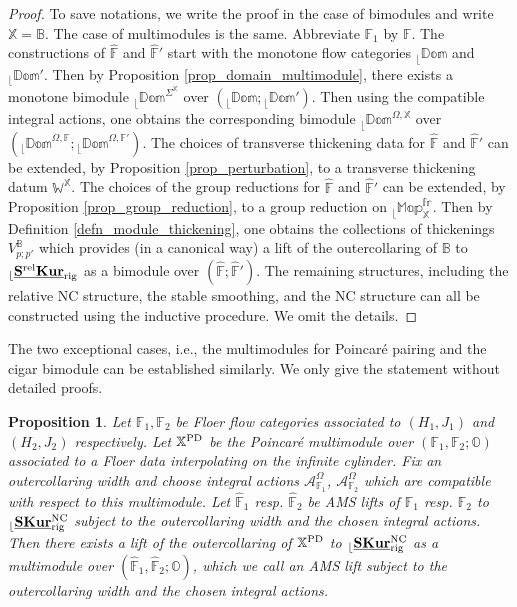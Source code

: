 \documentclass[reqno, 10pt]{amsart}
\numberwithin{equation}{section}
\numberwithin{equation}{section}
\newtheorem{prop}[thm]{Proposition}
\theoremstyle{definition}
\theoremstyle{remark}
\newcommand{\mb}{\mathbb}
\newcommand{\mc}{\mathcal}
\renewcommand{\outer}{{}_{\lfloor}}
\newcommand{\uds}[1]{\underline{\smash{#1}}}
\begin{document}
\begin{proof}
To save notations, we write the proof in the case of bimodules and write ${\mb X} = {\mb B}$. The case of multimodules is the same. Abbreviate ${\mb F}_1$ by ${\mb F}$. The constructions of $\hat {\mb F}$ and $\hat{\mb F}'$ start with the monotone flow categories $\outer \mb{Dom}$ and $\outer \mb{Dom}'$. Then by Proposition \ref{prop_domain_multimodule}, there exists a monotone bimodule $\outer \mb{Dom}^{\Sigma^{\mb X}}$ over $(\outer \mb{Dom}; \outer \mb{Dom}')$. Then using the compatible integral actions, one obtains the corresponding bimodule $\outer \mb{Dom}^{\Omega, {\mb X}}$ over $(\outer \mb{Dom}^{\Omega, {\mb F}}; \outer \mb{Dom}^{\Omega, {\mb F}'})$. The choices of transverse thickening data for $\hat {\mb F}$ and $\hat {\mb F}'$ can be extended, by Proposition \ref{prop_perturbation}, to a transverse thickening datum ${\mb W}^{\mb X}$. The choices of the group reductions for $\hat {\mb F}$ and $\hat {\mb F}'$ can be extended, by Proposition \ref{prop_group_reduction}, to a group reduction on $\outer \mb{Map}_{{\mb X}}^{\mb{fr}}$. Then by Definition \ref{defn_module_thickening}, one obtains the collections of thickenings $V_{p;p'}^{\mb B}$ which provides (in a canonical way) a lift of the outercollaring of ${\mb B}$ to $\outer \uds{\bf S^{\rm rel} Kur}_{\rm rig}$ as a bimodule over $(\hat {\mb F}; \hat{\mb F}')$. The remaining structures, including the relative NC structure, the stable smoothing, and the NC structure can all be constructed using the inductive procedure. We omit the details. 
\end{proof}

The two exceptional cases, i.e., the multimodules for Poincar\'e pairing and the cigar bimodule can be established similarly. We only give the statement without detailed proofs.

\begin{prop}\label{prop182}
Let ${\mb F}_1, {\mb F}_2$ be Floer flow categories associated to $(H_1, J_1)$ and $(H_2, J_2)$ respectively. Let ${\mb X}^{\rm PD}$ be the Poincar\'e multimodule over $({\mb F}_1, {\mb F}_2; {\mb O})$ associated to a Floer data interpolating on the infinite cylinder. Fix an outercollaring width and choose integral actions ${\mc A}_{{\mb F}_1}^\Omega$, ${\mc A}_{{\mb F}_2}^\Omega$ which are compatible with respect to this multimodule. Let $\hat {\mb F}_1$ resp. $\hat {\mb F}_2$ be AMS lifts of ${\mb F}_1$ resp. ${\mb F}_2$ to $\outer \uds{\bf SKur}_{\rm rig}^{\rm NC}$ subject to the outercollaring width and the chosen integral actions. Then there exists a lift of the outercollaring of ${\mb X}^{\rm PD}$ to $\outer \uds{\bf SKur}_{\rm rig}^{\rm NC}$ as a multimodule over $(\hat {\mb F}_1, \hat {\mb F}_2; {\mb O})$, which we call an AMS lift subject to the outercollaring width and the chosen integral actions.
\end{prop}
\end{document}
